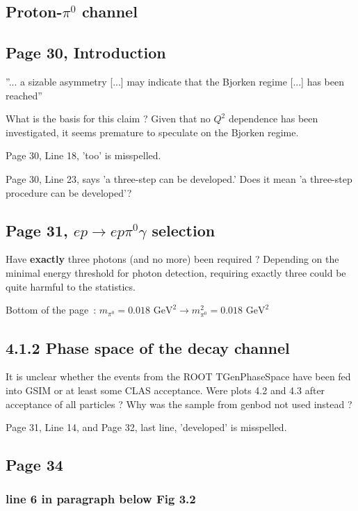 \documentclass[11pt]{paper}
\begin{document}
\subsection*{Proton-$\pi^0$ channel}

\subsection*{Page 30, Introduction}

''... a sizable asymmetry [...] may indicate that the Bjorken regime [...] has been reached''

What is the basis for this claim ? Given that no $Q^2$ dependence has been investigated, it seems premature to speculate on the Bjorken regime.

Page 30, Line 18, 'too' is misspelled.

Page 30, Line 23, says 'a three-step can be developed.' Does it mean 'a three-step procedure can be developed'?

\subsection*{Page 31, $ep\rightarrow ep\pi^0\gamma$ selection}

Have {\bf exactly} three photons (and no more) been required ?
Depending on the minimal energy threshold for photon detection, requiring exactly three could be quite harmful to the statistics.

Bottom of the page~: $m_{\pi^0}=0.018\mbox{ GeV}^2\rightarrow m^2_{\pi^0}=0.018\mbox{ GeV}^2$

\subsection*{4.1.2 Phase space of the decay channel}

It is unclear whether the events from the ROOT TGenPhaseSpace have been fed into GSIM or at least some CLAS acceptance.
Were plots 4.2 and 4.3 after acceptance of all particles ?
Why was the sample from genbod not used instead ?

Page 31, Line 14, and Page 32, last line, 'developed' is misspelled.

\subsection*{Page 34}
\subsubsection*{line 6 in paragraph below Fig 3.2}
\end{document}
